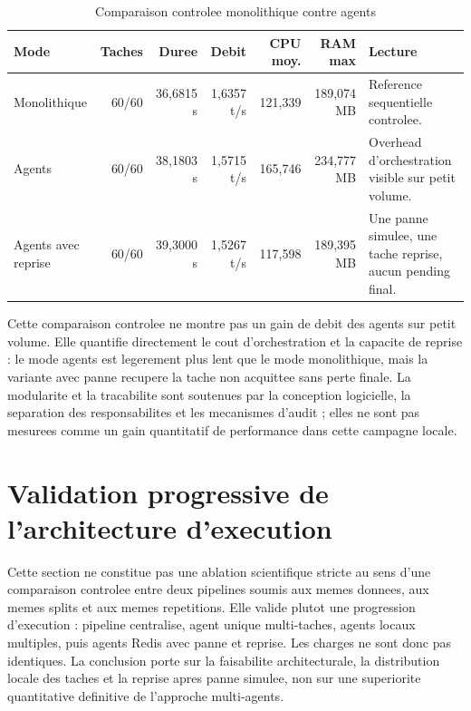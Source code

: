 \begin{table}[H]
\centering
\caption{Comparaison controlee monolithique contre agents}
\label{tab:controlled-monolith-agents}
\scriptsize
\begin{tabularx}{\textwidth}{p{3cm}rrrrrX}
\toprule
\textbf{Mode} & \textbf{Taches} & \textbf{Duree} & \textbf{Debit} & \textbf{CPU moy.} & \textbf{RAM max} & \textbf{Lecture} \\
\midrule
Monolithique & 60/60 & 36,6815 s & 1,6357 t/s & 121,339 & 189,074 MB & Reference sequentielle controlee. \\
Agents & 60/60 & 38,1803 s & 1,5715 t/s & 165,746 & 234,777 MB & Overhead d'orchestration visible sur petit volume. \\
Agents avec reprise & 60/60 & 39,3000 s & 1,5267 t/s & 117,598 & 189,395 MB & Une panne simulee, une tache reprise, aucun pending final. \\
\bottomrule
\end{tabularx}
\end{table}

Cette comparaison controlee ne montre pas un gain de debit des agents sur petit volume. Elle quantifie directement le cout d'orchestration et la capacite de reprise : le mode agents est legerement plus lent que le mode monolithique, mais la variante avec panne recupere la tache non acquittee sans perte finale. La modularite et la tracabilite sont soutenues par la conception logicielle, la separation des responsabilites et les mecanismes d'audit ; elles ne sont pas mesurees comme un gain quantitatif de performance dans cette campagne locale.

\section{Validation progressive de l'architecture d'execution}
Cette section ne constitue pas une ablation scientifique stricte au sens d'une comparaison controlee entre deux pipelines soumis aux memes donnees, aux memes splits et aux memes repetitions. Elle valide plutot une progression d'execution : pipeline centralise, agent unique multi-taches, agents locaux multiples, puis agents Redis avec panne et reprise. Les charges ne sont donc pas identiques. La conclusion porte sur la faisabilite architecturale, la distribution locale des taches et la reprise apres panne simulee, non sur une superiorite quantitative definitive de l'approche multi-agents.

